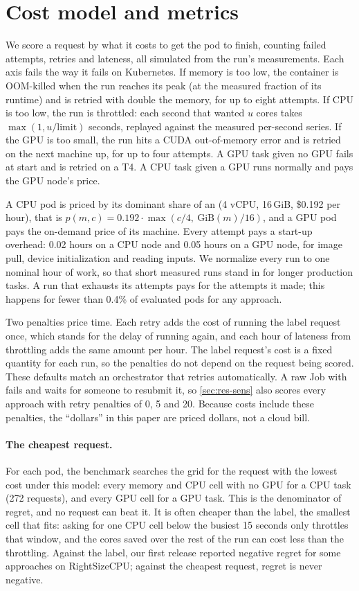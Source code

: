 \section{Cost model and metrics}
\label{sec:cost}

We score a request by what it costs to get the pod to finish, counting failed attempts, retries and lateness,
all simulated from the run's measurements. Each axis fails the way it fails on Kubernetes. If memory is too
low, the container is OOM-killed when the run reaches its peak (at the measured fraction of its runtime) and is
retried with double the memory, for up to eight attempts. If CPU is too low, the run is throttled: each second
that wanted $u$ cores takes $\max(1, u/\text{limit})$ seconds, replayed against the measured per-second series.
If the GPU is too small, the run hits a CUDA out-of-memory error and is retried on the next machine up, for up
to four attempts. A GPU task given no GPU fails at start and is retried on a T4. A CPU task given a GPU runs
normally and pays the GPU node's price.

A CPU pod is priced by its dominant share of an  (4 vCPU, 16\,GiB, \$0.192 per hour), that is
$p(m,c) = 0.192\cdot\max(c/4,\ \text{GiB}(m)/16)$, and a GPU pod pays the on-demand price of its machine. Every
attempt pays a start-up overhead: 0.02 hours on a CPU node and 0.05 hours on a GPU node, for image pull, device
initialization and reading inputs. We normalize every run to one nominal hour of work, so that short measured
runs stand in for longer production tasks. A run that exhausts its attempts pays for the attempts it made; this
happens for fewer than 0.4\% of evaluated pods for any approach.

Two penalties price time. Each retry adds the cost of running the label request once, which stands for the
delay of running again, and each hour of lateness from throttling adds the same amount per hour. The label
request's cost is a fixed quantity for each run, so the penalties do not depend on the request being scored.
These defaults match an orchestrator that retries automatically. A raw Job with  fails and
waits for someone to resubmit it, so \cref{sec:res-sens} also scores every approach with retry penalties of 0,
5 and 20. Because costs include these penalties, the ``dollars'' in this paper are priced dollars, not a cloud
bill.

\paragraph{The cheapest request.}
For each pod, the benchmark searches the grid for the request with the lowest cost under this model: every
memory and CPU cell with no GPU for a CPU task (272 requests), and every GPU cell for a GPU task. This is the
denominator of regret, and no request can beat it. It is often cheaper than the label, the smallest cell that
fits: asking for one CPU cell below the busiest 15 seconds only throttles that window, and the cores saved over
the rest of the run can cost less than the throttling. Against the label, our first release reported negative
regret for some approaches on RightSizeCPU; against the cheapest request, regret is never negative.

